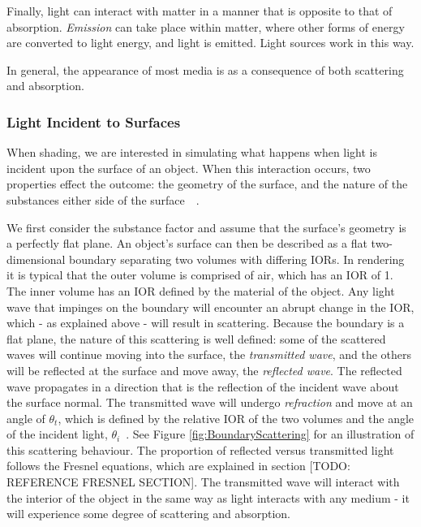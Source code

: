 Finally, light can interact with matter in a manner that is opposite to that of absorption. \textit{Emission} can take place within matter, where other forms of energy are converted to light energy, and light is emitted. Light sources work in this way.

In general, the appearance of most media is as a consequence of both scattering and absorption.

\subsubsection{Light Incident to Surfaces}

When shading, we are interested in simulating what happens when light is incident upon the surface of an object. When this interaction occurs, two properties effect the outcome: the geometry of the surface, and the nature of the substances either side of the surface~\cite{RTR4}~\cite{DiffuseSpecularAtSurfaces}.

We first consider the substance factor and assume that the surface's geometry is a perfectly flat plane. An object's surface can then be described as a flat two-dimensional boundary separating two volumes with differing IORs. In rendering it is typical that the outer volume is comprised of air, which has an IOR of 1. The inner volume has an IOR defined by the material of the object. Any light wave that impinges on the boundary will encounter an abrupt change in the IOR, which - as explained above - will result in scattering. Because the boundary is a flat plane, the nature of this scattering is well defined: some of the scattered waves will continue moving into the surface, the \textit{transmitted wave}, and the others will be reflected at the surface and move away, the \textit{reflected wave}. The reflected wave propagates in a direction that is the reflection of the incident wave about the surface normal. The transmitted wave will undergo \textit{refraction} and move at an angle of \begin{math}\theta_t\end{math}, which is defined by the relative IOR of the two volumes and the angle of the incident light, \begin{math}\theta_i\end{math}~\cite{SnellsLaw}. See Figure \ref{fig:BoundaryScattering} for an illustration of this scattering behaviour. The proportion of reflected versus transmitted light follows the Fresnel equations, which are explained in section [TODO: REFERENCE FRESNEL SECTION]. The transmitted wave will interact with the interior of the object in the same way as light interacts with any medium - it will experience some degree of scattering and absorption.

